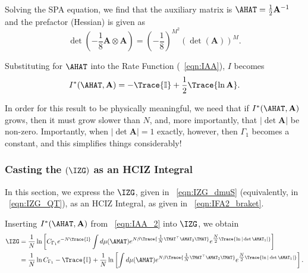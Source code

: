 Solving the SPA equation, we find that the auxiliary matrix is $\AHAT=\tfrac{1}{2}\mathbf{A}^{-1}$
and the prefactor (Hessian) is given as
\[
\det \left( -\frac{1}{8} \mathbf{A} \otimes \mathbf{A} \right) = \left( -\frac{1}{8} \right)^{M^2} \left( \det (\mathbf{A}) \right)^M.
\]

\noindent
Substituting for $\AHAT$ into the Rate Function (\EQN~\ref{eqn:IAA}), $I$ becomes
\begin{align}
\label{eqn:IAA_2}
I^{*}(\AHAT,\mathbf{A}) = -\Trace{ \mathbb{I} } + \frac{1}{2}\Trace{ \ln\mathbf{A} }  .
\end{align}

\noindent
In order for this result to be physically meaningful, 
we need that if $I^{*}(\AHAT,\mathbf{A})$ grows,
then it must grow slower than $N$, and,
more importantly, that $|\det \mathbf{A}|$ be non-zero.
Importantly, when $|\det \mathbf{A}|=1$ exactly, however, then $\Gamma_1$ becomes a constant,
and this simplifies things considerably!

\subsubsection{Casting the \GeneratingFunction $(\IZG)$ as an HCIZ Integral}
\label{sxn:TraceLogDerivation_B}

In this section, we express the \GeneratingFunction $\IZG$, 
given in \EQN~\ref{eqn:IZG_dmuS} (equivalently, in \EQN~\ref{eqn:IZG_QT}), 
as an HCIZ Integral, 
as given in \EQN~\ref{eqn:IFA2_braket}.

Inserting $I^{*}(\AHAT,\mathbf{A})$ from \EQN~\ref{eqn:IAA_2} into $\IZG$, we obtain
\begin{align}
  \label{eqn:IZG_IAA}
  \IZG 
  &= \frac{1}{N} \ln \left[ C_{\Gamma_1} e^{-N \Trace{\mathbb{I}}}\int d\mu(\AMAT)
  e^{N\beta \Trace{ \tfrac{1}{N}\TMAT^{\top}\AMAT_{2}\TMAT } }
  e^{\tfrac{N}{2}\Trace{\ln|\det\AMAT_{1}|}}\right]  \\ \nonumber
  &= \frac{1}{N} \ln C_{\Gamma_1}
  - \Trace{\mathbb{I}}
  + \frac{1}{N} \ln \left[ \int d\mu(\AMAT)
    e^{N\beta \Trace{ \tfrac{1}{N}\TMAT^{\top}\AMAT_{2}\TMAT } }
    e^{\tfrac{N}{2}\Trace{\ln|\det\AMAT_{1}|}}\right]  .
\end{align}

